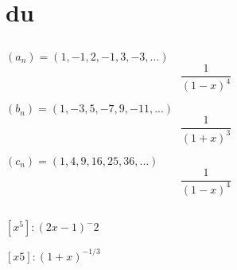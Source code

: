 \documentclass[a4paper]{article}
\begin{document}
\section{du}
\subsection{}

$
(a_n) = (1, -1, 2, -1, 3, -3, ...)
$
$$
\frac{1}{(1-x)^4}
$$

$
(b_n) = (1, -3, 5, -7, 9, -11, ...)
$
$$
\frac{1}{(1+x)^3}
$$


$
(c_n) = (1, 4, 9, 16, 25, 36, ...)
$
$$
\frac{1}{(1-x)^4}
$$

\subsection{}
$
[x^5] : (2x - 1)^-2
$

$
[x5] : (1 + x)^{-1/3}
$


\subsection{}
\end{document}

